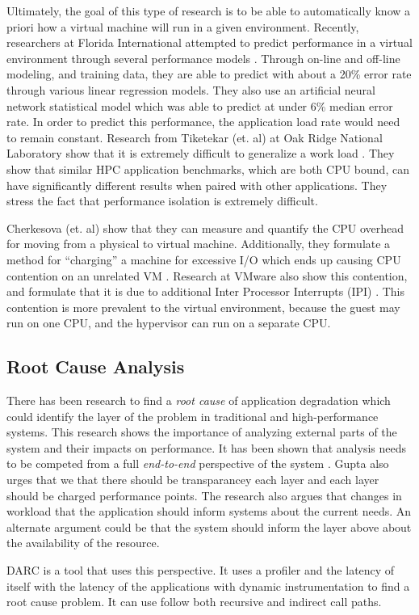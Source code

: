 Ultimately, the goal of this type of research is to be able to automatically know a priori how a virtual machine will run in a given environment.  Recently, researchers at Florida International attempted to predict performance in a virtual environment through several performance models \cite{kundu}.  Through on-line and off-line modeling, and training data, they are able to predict with about a 20\% error rate through various linear regression models.  They also use an artificial neural network statistical model which was able to predict at under 6\% median error rate.   In order to predict this performance, the application load rate would need to remain constant.  Research from Tiketekar (et. al) at Oak Ridge National Laboratory show that it is extremely difficult to generalize a work load \cite{tikotekar}.  They show that similar HPC application benchmarks, which are both CPU bound, can have significantly different results when paired with other applications.  They stress the fact that performance isolation is extremely difficult.

Cherkesova (et. al) show that they can measure and quantify the CPU overhead for moving from a physical to virtual machine.  Additionally, they formulate a method for “charging” a machine for excessive I/O which ends up causing CPU contention on an unrelated VM \cite{cherkasova}.  Research at VMware also show this contention, and formulate that it is due to additional Inter Processor Interrupts (IPI) \cite{ahmad}.   This contention is more prevalent to the virtual environment, because the guest may run on one CPU, and the hypervisor can run on a separate CPU. 

\subsection{Root Cause Analysis}
There has been research to find a \emph{root cause} of application degradation which could identify the layer of the problem in traditional \cite{traeger} and high-performance \cite{knapp1} systems.  This research shows the importance of analyzing external parts of the system and their impacts on performance.  It has been shown that analysis needs to be competed from a full \emph{end-to-end} perspective of the system \cite{saltzer}.  Gupta \cite{gupta1} also urges that we that there should be transparancey each layer and each layer should be charged performance points.  The research also argues that changes in workload that the application should inform systems about the current needs.  An alternate argument could be that the system should inform the layer above about the availability of the resource.  

DARC \cite{traeger} is a tool that uses this perspective.  It uses a profiler and the latency of itself with the latency of the applications with dynamic instrumentation to find a root cause problem.   It can use follow both recursive and indirect call paths.



